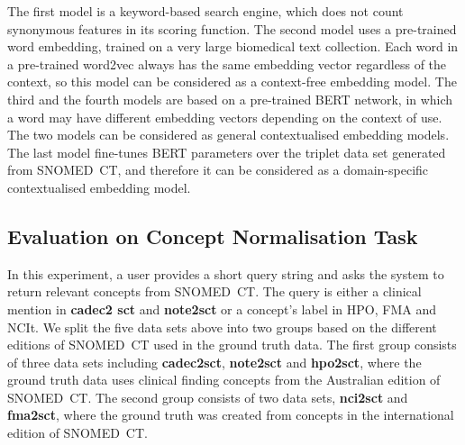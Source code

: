 \documentclass[preprint,12pt]{elsarticle}
\begin{document}
The first model is a keyword-based search engine, which does not count synonymous features in its scoring function. The second model uses a pre-trained word embedding, trained on a very large biomedical text collection. Each word in a pre-trained word2vec always has the same embedding vector regardless of the context, so this model can be considered as a context-free embedding model. The third and the fourth models are based on a pre-trained BERT network, in which a word may have different embedding vectors depending on the context of use. The two models can be considered as general contextualised embedding models. The last model fine-tunes BERT parameters over the triplet data set generated from SNOMED~CT, and therefore it can be considered as a domain-specific contextualised embedding model.

\subsection*{Evaluation on Concept Normalisation Task}
\label{sec:Text2Concept}

In this experiment, a user provides a short query string and asks the system to return relevant concepts from SNOMED~CT. The query is either a clinical mention in \textbf{cadec2 sct} and \textbf{note2sct} or a concept's label in HPO, FMA and NCIt. We split the five data sets above into two groups based on the different editions of SNOMED~CT used in the ground truth data. The first group consists of three data sets including \textbf{cadec2sct}, \textbf{note2sct} and \textbf{hpo2sct}, where the ground truth data uses clinical finding concepts from the Australian edition of SNOMED~CT. The second group consists of two data sets, \textbf{nci2sct} and \textbf{fma2sct}, where the ground truth was created from concepts in the international edition of SNOMED~CT.
\end{document}
